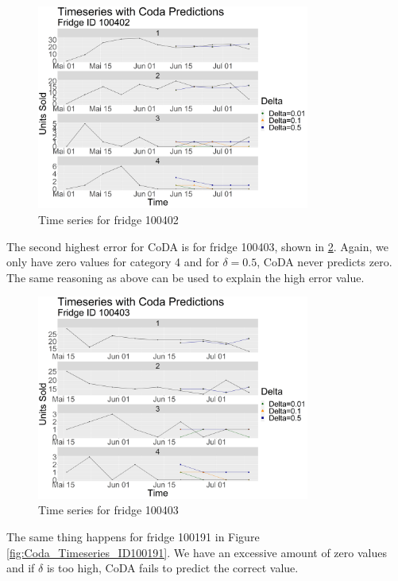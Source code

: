 \begin{figure}[htbp]
	\centering
		\includegraphics[width=0.80\textwidth]{Graphiken/Coda_Timeseries_VariationdL100402.png}
	\caption{Time series for fridge 100402}
	\label{fig:Coda_Timeseries_ID100402}
\end{figure}

The second highest error for CoDA is for fridge 100403, shown in \ref{fig:Coda_Timeseries_ID100403}. Again, we only have zero values for category 4 and for $\delta=0.5$, CoDA never predicts zero. The same reasoning as above can be used to explain the high error value. 

\begin{figure}[htbp]
	\centering
		\includegraphics[width=0.80\textwidth]{Graphiken/Coda_Timeseries_VariationdL100403.png}
	\caption{Time series for fridge 100403}
	\label{fig:Coda_Timeseries_ID100403}
\end{figure}

The same thing happens for fridge 100191 in Figure \ref{fig:Coda_Timeseries_ID100191}. We have an excessive amount of zero values and if $\delta$ is too high, CoDA fails to predict the correct value. 

